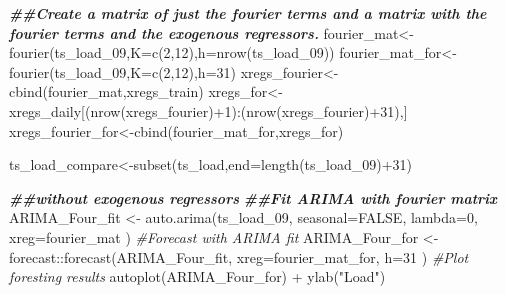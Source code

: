 \documentclass[
]{article}
\newenvironment{Shaded}{\begin{snugshade}}{\end{snugshade}}
\newcommand{\AttributeTok}[1]{\textcolor[rgb]{0.77,0.63,0.00}{#1}}
\newcommand{\CommentTok}[1]{\textcolor[rgb]{0.56,0.35,0.01}{\textit{#1}}}
\newcommand{\ConstantTok}[1]{\textcolor[rgb]{0.00,0.00,0.00}{#1}}
\newcommand{\DecValTok}[1]{\textcolor[rgb]{0.00,0.00,0.81}{#1}}
\newcommand{\DocumentationTok}[1]{\textcolor[rgb]{0.56,0.35,0.01}{\textbf{\textit{#1}}}}
\newcommand{\FunctionTok}[1]{\textcolor[rgb]{0.00,0.00,0.00}{#1}}
\newcommand{\NormalTok}[1]{#1}
\newcommand{\OtherTok}[1]{\textcolor[rgb]{0.56,0.35,0.01}{#1}}
\newcommand{\SpecialCharTok}[1]{\textcolor[rgb]{0.00,0.00,0.00}{#1}}
\newcommand{\StringTok}[1]{\textcolor[rgb]{0.31,0.60,0.02}{#1}}
\begin{document}
\begin{Shaded}
\begin{Highlighting}[]
\DocumentationTok{\#\#Create a matrix of just the fourier terms and a matrix with the fourier terms and the exogenous regressors. }
\NormalTok{fourier\_mat}\OtherTok{\textless{}{-}}\FunctionTok{fourier}\NormalTok{(ts\_load\_09,}\AttributeTok{K=}\FunctionTok{c}\NormalTok{(}\DecValTok{2}\NormalTok{,}\DecValTok{12}\NormalTok{),}\AttributeTok{h=}\FunctionTok{nrow}\NormalTok{(ts\_load\_09))}
\NormalTok{fourier\_mat\_for}\OtherTok{\textless{}{-}}\FunctionTok{fourier}\NormalTok{(ts\_load\_09,}\AttributeTok{K=}\FunctionTok{c}\NormalTok{(}\DecValTok{2}\NormalTok{,}\DecValTok{12}\NormalTok{),}\AttributeTok{h=}\DecValTok{31}\NormalTok{)}
\NormalTok{xregs\_fourier}\OtherTok{\textless{}{-}}\FunctionTok{cbind}\NormalTok{(fourier\_mat,xregs\_train)}
\NormalTok{xregs\_for}\OtherTok{\textless{}{-}}\NormalTok{xregs\_daily[(}\FunctionTok{nrow}\NormalTok{(xregs\_fourier)}\SpecialCharTok{+}\DecValTok{1}\NormalTok{)}\SpecialCharTok{:}\NormalTok{(}\FunctionTok{nrow}\NormalTok{(xregs\_fourier)}\SpecialCharTok{+}\DecValTok{31}\NormalTok{),]}
\NormalTok{xregs\_fourier\_for}\OtherTok{\textless{}{-}}\FunctionTok{cbind}\NormalTok{(fourier\_mat\_for,xregs\_for)}


\NormalTok{ts\_load\_compare}\OtherTok{\textless{}{-}}\FunctionTok{subset}\NormalTok{(ts\_load,}\AttributeTok{end=}\FunctionTok{length}\NormalTok{(ts\_load\_09)}\SpecialCharTok{+}\DecValTok{31}\NormalTok{)}

\DocumentationTok{\#\#without exogenous regressors}
\DocumentationTok{\#\#Fit ARIMA with fourier matrix}
\NormalTok{ARIMA\_Four\_fit }\OtherTok{\textless{}{-}} \FunctionTok{auto.arima}\NormalTok{(ts\_load\_09, }
                             \AttributeTok{seasonal=}\ConstantTok{FALSE}\NormalTok{, }
                             \AttributeTok{lambda=}\DecValTok{0}\NormalTok{,}
                             \AttributeTok{xreg=}\NormalTok{fourier\_mat}
\NormalTok{                             )}
\CommentTok{\#Forecast with ARIMA fit}
\NormalTok{ARIMA\_Four\_for }\OtherTok{\textless{}{-}}\NormalTok{ forecast}\SpecialCharTok{::}\FunctionTok{forecast}\NormalTok{(ARIMA\_Four\_fit,}
                           \AttributeTok{xreg=}\NormalTok{fourier\_mat\_for,}
                           \AttributeTok{h=}\DecValTok{31}
\NormalTok{                           ) }
\CommentTok{\#Plot foresting results}
\FunctionTok{autoplot}\NormalTok{(ARIMA\_Four\_for) }\SpecialCharTok{+} \FunctionTok{ylab}\NormalTok{(}\StringTok{"Load"}\NormalTok{)}
\end{Highlighting}
\end{Shaded}
\end{document}
